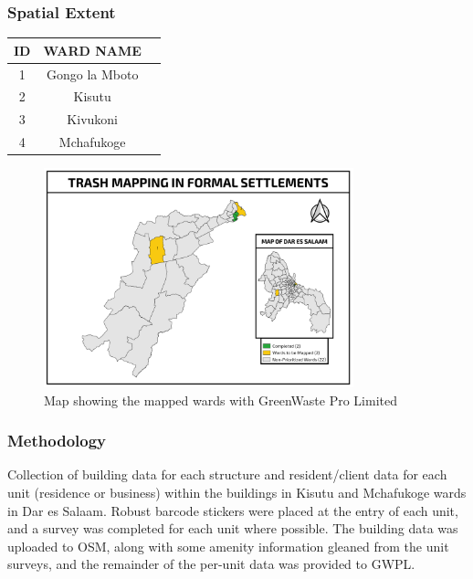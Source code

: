 \documentclass[a4paper,12pt,twoside]{article}
\begin{document}
\subsubsection{Spatial Extent}

\begin{center}
\begin{tabular}{|c|c|c|}
\hline
ID & WARD NAME\\
\hline
1 & Gongo la Mboto\\
\hline
2 & Kisutu\\
\hline
3 & Kivukoni\\
\hline
4 & Mchafukoge\\
 \hline
\end{tabular}
\end{center}

\begin{figure}[h]
  \color{RHgreen}\caption{Map showing the mapped wards with GreenWaste Pro Limited}
  \centering
 \includegraphics[width=0.8\textwidth]{images/GWPL.png}
\end{figure}

\subsubsection{Methodology}

Collection of building data for each structure and resident/client data for each unit (residence or business) within the buildings in Kisutu and Mchafukoge wards in Dar es Salaam. Robust barcode stickers were placed at the entry of each unit, and a survey was completed for each unit where possible. The building data was uploaded to OSM, along with some amenity information gleaned from the unit surveys, and the remainder of the per-unit data was provided to GWPL.
\end{document}
